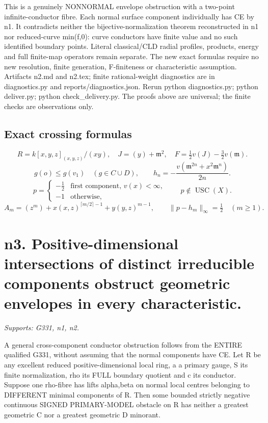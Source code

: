 \documentclass[11pt]{article}
\begin{document}
This is a genuinely NONNORMAL envelope obstruction with a two-point infinite-conductor fibre. Each normal surface component individually has CE by n1. It contradicts neither the bijective-normalization theorem reconstructed in n1 nor reduced-curve min(f,0): curve conductors have finite value and no such identified boundary points. Literal classical/CLD radial profiles, products, energy and full finite-map operators remain separate. The new exact formulas require no new resolution, finite generation, F-finiteness or characteristic assumption. Artifacts n2.md and n2.tex; finite rational-weight diagnostics are in diagnostics.py and reports/diagnostics.json. Rerun python diagnostics.py; python deliver.py; python check\_delivery.py. The proofs above are universal; the finite checks are observations only.

\subsection*{Exact crossing formulas}
\[
 R=k[x,y,z]_{(x,y,z)}/(xy),\quad
 J=(y)+\mathfrak m^2,\quad F=\tfrac12v(J)-\tfrac32v(\mathfrak m).
\]
\[
 g(o)\le g(v_1)\quad(g\in C\cup D),\qquad
 h_n=-\frac{v(\mathfrak m^{2n}+x^2\mathfrak m^n)}{2n}.
\]
\[
 p=\begin{cases}-\tfrac12&\text{first component, }v(x)<\infty,\\
 -1&\text{otherwise},\end{cases}\qquad p\notin\operatorname{USC}(X).
\]
\[
 A_m=(z^m)+x(x,z)^{\lceil m/2\rceil-1}+y(y,z)^{m-1},\qquad
 \|p-h_m\|_\infty=\tfrac12\quad(m\ge1).
\]


\section{n3. Positive-dimensional intersections of distinct irreducible components obstruct geometric envelopes in every characteristic.}
\textit{Supports: G331, n1, n2.}

A general cross-component conductor obstruction follows from the ENTIRE qualified G331, without assuming that the normal components have CE. Let R be any excellent reduced positive-dimensional local ring, a a primary gauge, S its finite normalization, rho its FULL boundary quotient and c its conductor. Suppose one rho-fibre has lifts alpha,beta on normal local centres belonging to DIFFERENT minimal components of R. Then some bounded strictly negative continuous SIGNED PRIMARY-MODEL obstacle on R has neither a greatest geometric C nor a greatest geometric D minorant.
\end{document}
